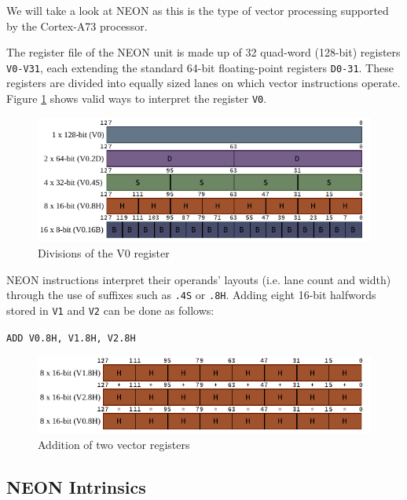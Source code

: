 We will take a look at NEON as this is the type of vector processing supported
by the Cortex-A73 processor.

The register file of the NEON unit is made up of 32 quad-word (128-bit)
registers \texttt{V0-V31}, each extending the standard 64-bit floating-point
registers \mbox{\texttt{D0-31}}. These registers are divided into equally sized
lanes on which vector instructions operate. Figure \ref{fig:regdivs} shows
valid ways to interpret the register \texttt{V0}.

\begin{figure}[h!]
    \centering
    \includegraphics[width=\textwidth]{Figures/V_register.pdf}
    \caption{Divisions of the V0 register}
    \label{fig:regdivs}
\end{figure}

NEON instructions interpret their operands' layouts (i.e. lane count and width)
through the use of suffixes such as \texttt{.4S} or \texttt{.8H}. Adding eight
16-bit halfwords stored in \texttt{V1} and \texttt{V2} can be done as follows:

\begin{center}
    \texttt{ADD V0.8H, V1.8H, V2.8H}
\end{center}

\begin{figure}[h!]
    \centering
    \includegraphics[width=\textwidth]{Figures/vector_add.pdf}
    \caption{Addition of two vector registers}
\end{figure}

\subsection{NEON Intrinsics}

